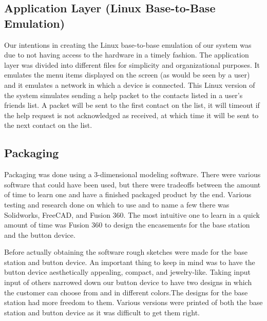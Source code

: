 \documentclass[journal,compsoc]{IEEEtran}
\begin{document}
\subsection{Application Layer (Linux Base-to-Base Emulation)}
Our intentions in creating the Linux base-to-base emulation of our system was due to not having access to the hardware in a timely fashion.  The application layer was divided into different files for simplicity and organizational purposes.  It emulates the menu items displayed on the screen (as would be seen by a user) and it emulates a network in which a device is connected.  This Linux version of the system simulates sending a help packet to the contacts listed in a user’s friends list.  A packet will be sent to the first contact on the list, it will timeout if the help request is not acknowledged as received, at which time it will be sent to the next contact on the list.

\subsection{Packaging}
Packaging was done using a 3-dimensional modeling software. There were various software that could have been used, but there were tradeoffs between the amount of time to learn one and have a finished packaged product by the end. Various testing and research done on which to use and to name a few there was Solidworks, FreeCAD, and Fusion 360. The most intuitive one to learn in a quick amount of time was Fusion 360 to design the encasements for the base station and the button device. 

Before actually obtaining the software rough sketches were made for the base station and button device. An important thing to keep in mind was to have the button device aesthetically appealing, compact, and jewelry-like. Taking input input of others narrowed down our button device to have two designs in which the customer can choose from and in different colors.The designs for the base station had more freedom to them. Various versions were printed of both the base station and button device as it was difficult to get them right.

%
%
\end{document}
